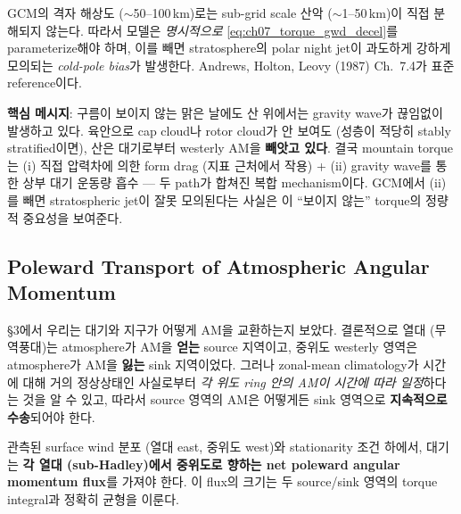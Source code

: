 
\begin{remark}\label{rem:ch07_torque_gwd_models}
GCM의 격자 해상도 ($\sim$50--100\,km)로는 sub-grid scale 산악 ($\sim$1--50\,km)이
직접 분해되지 않는다.  따라서 모델은 \textit{명시적으로} \eqref{eq:ch07_torque_gwd_decel}를
parameterize해야 하며, 이를 빼면 stratosphere의 polar night jet이 과도하게
강하게 모의되는 \textit{cold-pole bias}가 발생한다.  Andrews, Holton, Leovy
(1987) Ch.~7.4가 표준 reference이다.
\end{remark}

\begin{hisublock}
\textbf{핵심 메시지}: 구름이 보이지 않는 맑은 날에도 산 위에서는 gravity wave가
끊임없이 발생하고 있다.  육안으로 cap cloud나 rotor cloud가 안 보여도 (성층이
적당히 stably stratified이면), 산은 대기로부터 westerly AM을 \textbf{빼앗고
있다}.  결국 mountain torque는 (i) 직접 압력차에 의한 form drag (지표 근처에서
작용) + (ii) gravity wave를 통한 상부 대기 운동량 흡수 — 두 path가 합쳐진
복합 mechanism이다.  GCM에서 (ii)를 빼면 stratospheric jet이 잘못 모의된다는
사실은 이 ``보이지 않는'' torque의 정량적 중요성을 보여준다.
\end{hisublock}


\subsection{Poleward Transport of Atmospheric Angular Momentum}

\S3에서 우리는 대기와 지구가 어떻게 AM을 교환하는지 보았다.  결론적으로
열대 (무역풍대)는 atmosphere가 AM을 \textbf{얻는} source 지역이고, 중위도
westerly 영역은 atmosphere가 AM을 \textbf{잃는} sink 지역이었다.
그러나 zonal-mean climatology가 시간에 대해 거의 정상상태인 사실로부터
\textit{각 위도 ring 안의 AM이 시간에 따라 일정}하다는 것을 알 수 있고,
따라서 source 영역의 AM은 어떻게든 sink 영역으로 \textbf{지속적으로 수송}되어야
한다.

\begin{theorem}\label{thm:ch07_trans_necessity}
관측된 surface wind 분포 (열대 east, 중위도 west)와 stationarity 조건 하에서,
대기는 \textbf{각 열대 (sub-Hadley)에서 중위도로 향하는 net poleward angular
momentum flux}를 가져야 한다.  이 flux의 크기는 두 source/sink 영역의
torque integral과 정확히 균형을 이룬다.
\end{theorem}

